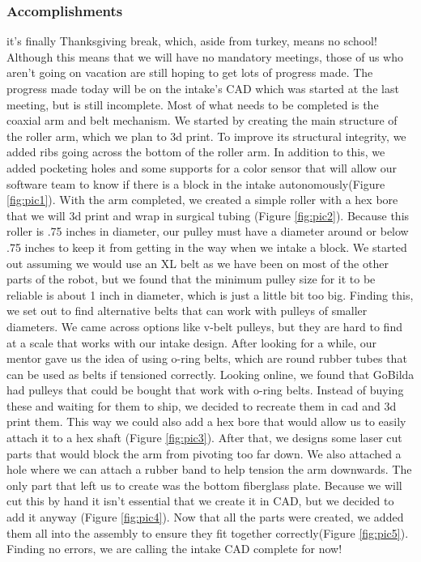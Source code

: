 \subsubsection*{Accomplishments}
it's finally Thanksgiving break, which, aside from turkey, means no school! Although this means that we will have no mandatory meetings, those of us who aren't going on vacation are still hoping to get lots of progress made. The progress made today will be on the intake’s CAD which was started at the last meeting, but is still incomplete. 
Most of what needs to be completed is the coaxial arm and belt mechanism. We started by creating the main structure of the roller arm, which we plan to 3d print. To improve its structural integrity, we added ribs going across the bottom of  the roller arm. In addition to this, we added pocketing holes and some supports for a color sensor that will allow our software team to know if there is a block in the intake autonomously(Figure \ref{fig:pic1}). 
With the arm completed, we created a simple roller with a hex bore that we will 3d print and wrap in surgical tubing (Figure \ref{fig:pic2}). Because this roller is .75 inches in diameter, our pulley must have a diameter around or below .75 inches to keep it from getting in the way when we intake a block. We started out assuming we would use an XL belt as we have been on most of the other parts of the robot, but we found that the minimum pulley size for it to be reliable is about 1 inch in diameter, which is just a little bit too big. Finding this, we set out to find alternative belts that can work with pulleys of smaller diameters. We came across options like v-belt pulleys, but they are hard to find at a scale that works with our intake design. After looking for a while, our mentor gave us the idea of using o-ring belts, which are round rubber tubes that can be used as belts if tensioned correctly. Looking online, we found that GoBilda had pulleys that could be bought  that work with o-ring belts. Instead of buying these and waiting for them to ship, we decided to recreate them in cad and 3d print them. This way we could also add a hex bore that would allow us to easily attach it to a hex shaft (Figure \ref{fig:pic3}). After that, we designs some laser cut parts that would block the arm from pivoting too far down. We also attached a hole where we can attach a rubber band to help tension the arm downwards. The only part that left us to create was the bottom fiberglass plate. Because we will cut this by hand it isn’t essential that we create it in CAD, but we decided to add it anyway (Figure \ref{fig:pic4}).
Now that all the parts were created, we added them all into the assembly to ensure they fit together correctly(Figure \ref{fig:pic5}). Finding no errors, we are calling the intake CAD complete for now!
 

